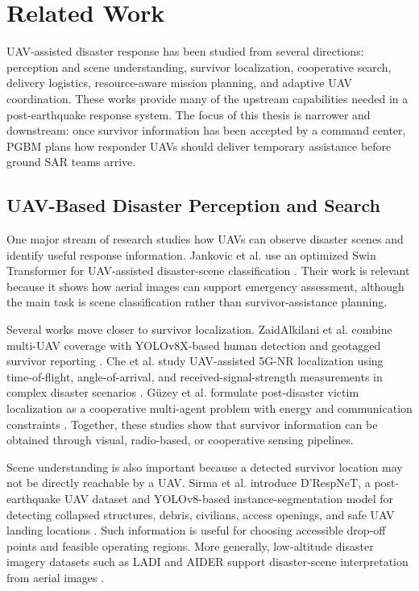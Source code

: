 \chapter{Related Work}
\label{chapter_related_work}

UAV-assisted disaster response has been studied from several directions:
perception and scene understanding, survivor localization, cooperative search,
delivery logistics, resource-aware mission planning, and adaptive UAV
coordination. These works provide many of the upstream capabilities needed in a
post-earthquake response system. The focus of this thesis is narrower and
downstream: once survivor information has been accepted by a command center,
PGBM plans how responder UAVs should deliver temporary assistance before ground
SAR teams arrive.

\section{UAV-Based Disaster Perception and Search}
\label{sec_related_detection}

One major stream of research studies how UAVs can observe disaster scenes and
identify useful response information. Jankovic et al. use an optimized Swin
Transformer for UAV-assisted disaster-scene classification
\cite{jankovic2025transformer}. Their work is relevant because it shows how
aerial images can support emergency assessment, although the main task is scene
classification rather than survivor-assistance planning.

Several works move closer to survivor localization. ZaidAlkilani et al.
combine multi-UAV coverage with YOLOv8X-based human detection and geotagged
survivor reporting \cite{zaidalkilani2026aiuav}. Che et al. study
UAV-assisted 5G-NR localization using time-of-flight, angle-of-arrival, and
received-signal-strength measurements in complex disaster scenarios
\cite{che2025uav5g}. G\"uzey et al. formulate post-disaster victim
localization as a cooperative multi-agent problem with energy and
communication constraints \cite{guzey2026fedqmix}. Together, these studies
show that survivor information can be obtained through visual, radio-based, or
cooperative sensing pipelines.

Scene understanding is also important because a detected survivor location may
not be directly reachable by a UAV. Sirma et al. introduce D'RespNeT, a
post-earthquake UAV dataset and YOLOv8-based instance-segmentation model for
detecting collapsed structures, debris, civilians, access openings, and safe
UAV landing locations \cite{sirma2025drespnet}. Such information is useful for
choosing accessible drop-off points and feasible operating regions. More
generally, low-altitude disaster imagery datasets such as LADI and AIDER
support disaster-scene interpretation from aerial images
\cite{scheele2025ladi,kyrkou2020emergencynet}.

